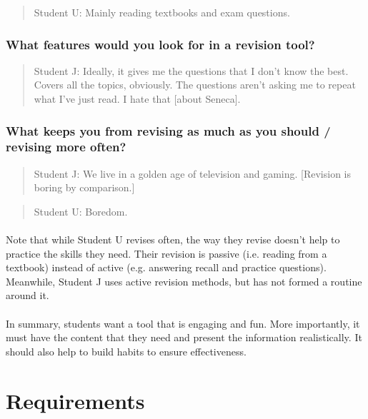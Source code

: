 \documentclass{report}
\begin{document}
\begin{quote}{Student U:}
  Mainly reading textbooks and exam questions.
\end{quote}
\subsubsection{What features would you look for in a revision tool?}
\begin{quote}{Student J:}
  Ideally, it gives me the questions that I don't know the best. Covers all the topics, obviously. The questions aren't asking me to repeat what I've just read. I hate that [about Seneca].
\end{quote}

\subsubsection{What keeps you from revising as much as you should / revising more often?}
\begin{quote}{Student J:}
  We live in a golden age of television and gaming. [Revision is boring by comparison.]
\end{quote}

\begin{quote}{Student U:}
  Boredom.
\end{quote}
\hrulefill

\paragraph{}
Note that while Student U revises often, the way they revise doesn't help to practice the skills they need. Their revision is passive (i.e. reading from a textbook) instead of active (e.g. answering recall and practice questions). Meanwhile, Student J uses active revision methods, but has not formed a routine around it.

\paragraph{}
In summary, students want a tool that is engaging and fun. More importantly, it must have the content that they need and present the information realistically. It should also help to build habits to ensure effectiveness.

\section{Requirements}
\end{document}
